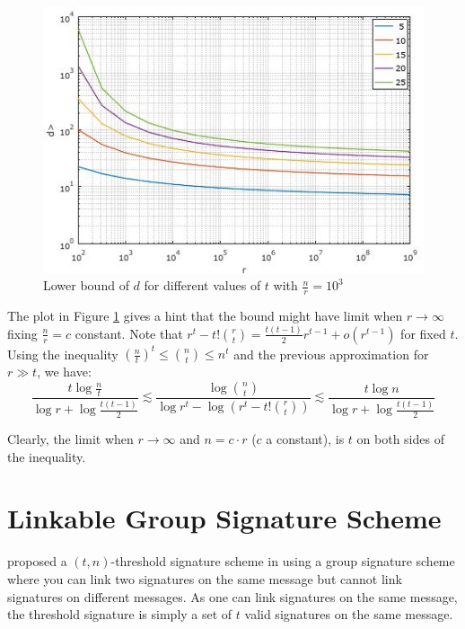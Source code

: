 \begin{figure}[H]
    \begin{center}
        \includegraphics[scale=1.5]{images/phf.jpg}
    \end{center}

    \caption{Lower bound of $d$ for different values of $t$ with $\frac{n}{r} = 10^3$}
    \label{fig:phf} 
\end{figure}

The plot in Figure \ref{fig:phf} gives a hint that the bound might have limit when $r \rightarrow \infty$ fixing $\frac{n}{r}=c$ constant. Note that $r^t - t! \binom{r}{t} = \frac{t(t-1)}{2}r^{t-1} + o(r^{t-1})$ for fixed $t$. Using the inequality $ \left( \frac{n}{t} \right)^t \leq \binom{n}{t} \leq n^t$ and the previous approximation for $r \gg t$, we have:
$$\frac{t \log \frac{n}{t}}{\log r + \log \frac{t(t-1)}{2}} \lesssim \frac{\log \binom{n}{t}}{\log r^t - \log (r^t - t! \binom{r}{t})} \lesssim \frac{t \log n}{\log r + \log \frac{t(t-1)}{2}}$$

Clearly, the limit when $r \rightarrow \infty$ and $n = c \cdot r$ ($c$ a constant), is $t$ on both sides of the inequality.

\section{Linkable Group Signature Scheme}
\label{sec:chen}
\citeauthor{ChenNW11} proposed a $(t,n)$-threshold signature scheme in \cite{ChenNW11} using a group signature scheme where you can link two signatures on the same message but cannot link signatures on different messages. As one can link signatures on the same message, the threshold signature is simply a set of $t$ valid signatures on the same message.
